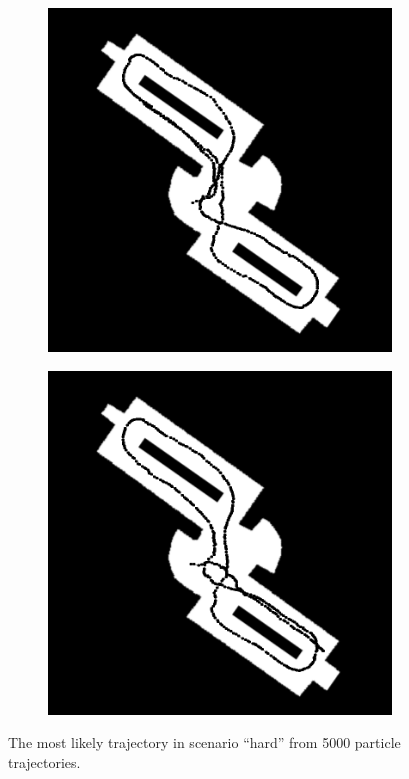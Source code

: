 \documentclass[11pt, a4paper]{article}
\begin{document}
\begin{figure}[htbp]
\centering
	\begin{subfigure}
	\centering
	\includegraphics[scale=0.3]{hard-1.png}
	\end{subfigure}
	\begin{subfigure}
	\centering
	\includegraphics[scale=0.3]{hard-2.png}
	\end{subfigure}
\caption{The most likely trajectory in scenario ``hard'' from 5000 particle trajectories.}
\label{fig:hard}
\end{figure}
\end{document}
